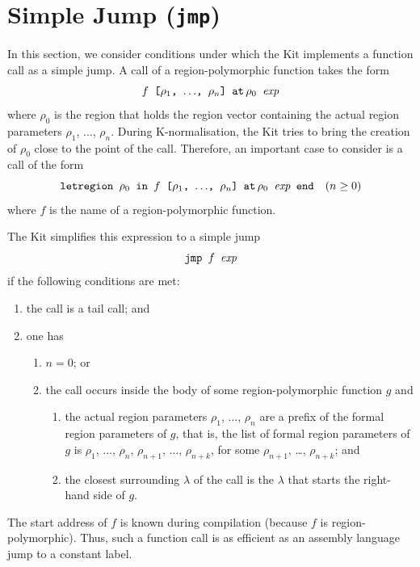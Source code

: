 \documentclass[12pt]{book}
\begin{document}
\section{Simple Jump ({\tt jmp})}
\label{simplejump.sec}
In this section, we consider conditions under which the Kit implements
a function call as a simple 
%
jump. A call of a region-polymorphic function takes the form
$$\hbox{\tt $f$ [$\rho_1$, $\ldots$, $\rho_n$] $\mathbin{\hbox{\tt at}}\,\rho_0$ $\hbox{\it exp}$}$$
where $\rho_0$ is the region that holds the region vector containing
the actual region parameters $\rho_1$, $\ldots$, $\rho_n$.  During
K-normalisation, the Kit tries to bring the
creation of $\rho_0$ close to the point of the call. Therefore, an
important case to consider is a call of the form
\begin{equation}
\label{ntcall}
\hbox{\tt letregion $\rho_0$ in $f$ [$\rho_1$, $\ldots$, $\rho_n$] $\mathbin{\hbox{\tt at}}\,\rho_0$ $\hbox{\it exp}$ end}\quad (n\geq0)
\end{equation}
where $f$ is the name of a region-polymorphic function.

The Kit simplifies this expression to a simple jump
$$\hbox{\tt jmp $f$ $\hbox{\it exp}$}$$
if the following conditions are met:
\begin{enumerate}
  \item \label{cond1}
    the call is a tail call; and
  \item \label{cond2}
    one has 
      \begin{enumerate}
         \item \label{cond2a} $n=0$; or
         \item \label{cond2b} the call occurs 
               inside the body of some region-polymorphic
               function $g$ and
                 \begin{enumerate}
                   \item \label{cond2ba}
                       the actual region parameters 
                       $\rho_1$, $\ldots$, $\rho_n$ are a prefix
                       of the formal region parameters of $g$, 
                       that is, the list of formal region parameters of $g$
                       is \boxml{[}$\rho_1$, $\ldots$, $\rho_n$, 
                       $\rho_{n+1}$, $\ldots$, $\rho_{n+k}$\boxml{]}, 
                       for some
                       $\rho_{n+1}$, \ldots, $\rho_{n+k}$; and 
                   \item \label{cond2bb}
                       the closest surrounding $\lambda$ of the call 
                       is the $\lambda$ that starts the
                       right-hand side of $g$.
                  \end{enumerate}
       \end{enumerate}
\end{enumerate}
The start address of $f$ is known during compilation (because
$f$ is region-polymorphic). Thus, such a function call
is as efficient as an assembly language jump to a constant
label.
\end{document}
